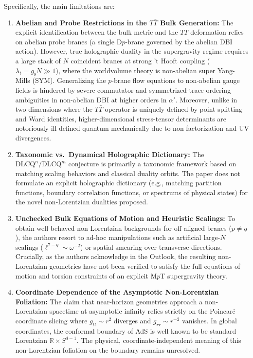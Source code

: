 \documentclass[11pt,a4paper]{article}
\begin{document}
Specifically, the main limitations are:
\begin{enumerate}
    \item \textbf{Abelian and Probe Restrictions in the $T\bar{T}$ Bulk Generation:}
    The explicit identification between the bulk metric and the $T\bar{T}$ deformation relies on abelian probe branes (a single D$p$-brane governed by the abelian DBI action). However, true holographic duality in the supergravity regime requires a large stack of $N$ coincident branes at strong 't Hooft coupling ($\lambda_{\text{t}} = g_{\text{s}} N \gg 1$), where the worldvolume theory is non-abelian super Yang-Mills (SYM). Generalizing the $p$-brane flow equations to non-abelian gauge fields is hindered by severe commutator and symmetrized-trace ordering ambiguities in non-abelian DBI at higher orders in $\alpha'$. Moreover, unlike in two dimensions where the $T\bar{T}$ operator is uniquely defined by point-splitting and Ward identities, higher-dimensional stress-tensor determinants are notoriously ill-defined quantum mechanically due to non-factorization and UV divergences.

    \item \textbf{Taxonomic vs.\ Dynamical Holographic Dictionary:}
    The $\text{DLCQ}^n/\text{DLCQ}^m$ conjecture is primarily a taxonomic framework based on matching scaling behaviors and classical duality orbits. The paper does not formulate an explicit holographic dictionary (e.g., matching partition functions, boundary correlation functions, or spectrums of physical states) for the novel non-Lorentzian dualities proposed. 

    \item \textbf{Unchecked Bulk Equations of Motion and Heuristic Scalings:}
    To obtain well-behaved non-Lorentzian backgrounds for off-aligned branes ($p \neq q$), the authors resort to ad-hoc manipulations such as artificial large-$N$ scalings ($\ell^{7-q} \sim \omega^{-2}$) or spatial smearing over transverse directions. Crucially, as the authors acknowledge in the Outlook, the resulting non-Lorentzian geometries have not been verified to satisfy the full equations of motion and torsion constraints of an explicit M$p$T supergravity theory.

    \item \textbf{Coordinate Dependence of the Asymptotic Non-Lorentzian Foliation:}
    The claim that near-horizon geometries approach a non-Lorentzian spacetime at asymptotic infinity relies strictly on the Poincar\'e coordinate slicing where $g_{tt} \sim r^2$ diverges and $g_{rr} \sim r^{-2}$ vanishes. In global coordinates, the conformal boundary of AdS is well known to be standard Lorentzian $\mathbb{R} \times S^{d-1}$. The physical, coordinate-independent meaning of this non-Lorentzian foliation on the boundary remains unresolved.
\end{enumerate}
\end{document}
